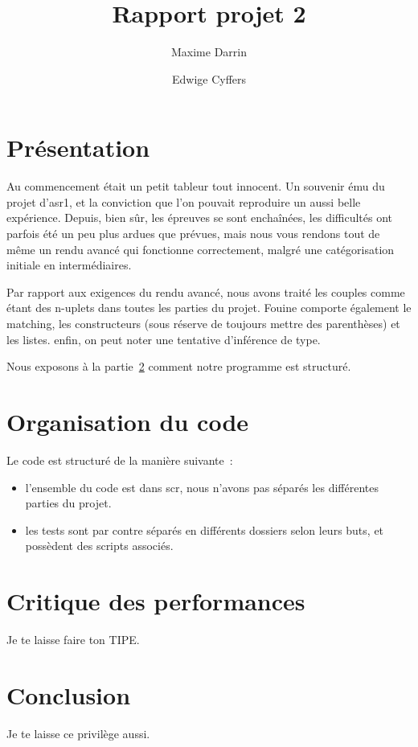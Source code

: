 \documentclass{article}
\title{Rapport projet 2}
\author{Maxime Darrin  \and Edwige Cyffers }
\date{}
\begin{document}
\maketitle

\section{Présentation}

	Au commencement était un petit tableur tout innocent. Un souvenir ému du projet d'asr1, et la conviction que l'on pouvait reproduire un aussi belle expérience. Depuis, bien sûr, les épreuves se sont enchaînées, les difficultés ont parfois été un peu plus ardues que prévues, mais nous vous rendons tout de même un rendu avancé qui fonctionne correctement, malgré une catégorisation initiale en intermédiaires.
	
	Par rapport aux exigences du rendu avancé, nous avons traité les couples comme étant des n-uplets dans toutes les parties du projet. Fouine comporte également le matching, les constructeurs (sous réserve de toujours mettre des parenthèses) et les listes. enfin, on peut noter une tentative d'inférence de type.


	Nous exposons à la partie~\ref{s:orga} comment notre programme est structuré.


\section{Organisation du code}
\label{s:orga}

Le code est structuré de la manière suivante~:
\begin{itemize}
\item l'ensemble du code est dans scr, nous n'avons pas séparés les différentes parties du projet.
\item les tests sont par contre séparés en différents dossiers selon leurs buts, et possèdent des scripts associés.

\end{itemize}

\section{Critique des performances}

	Je te laisse faire ton TIPE.
	
\section{Conclusion}
	Je te laisse ce privilège aussi.



\end{document}
